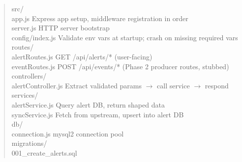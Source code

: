 \documentclass[11pt]{article}
\begin{document}
\begin{quote}
\small\ttfamily
src/ \\
\hspace*{1em}app.js\hspace{3.7cm} Express app setup, middleware registration in order \\
\hspace*{1em}server.js\hspace{3.3cm} HTTP server bootstrap \\
\hspace*{1em}config/index.js\hspace{2cm} Validate env vars at startup; crash on missing required vars \\
\hspace*{1em}routes/ \\
\hspace*{2em}alertRoutes.js\hspace{1.8cm} GET /api/alerts/* (user-facing) \\
\hspace*{2em}eventRoutes.js\hspace{1.8cm} POST /api/events/* (Phase 2 producer routes, stubbed) \\
\hspace*{1em}controllers/ \\
\hspace*{2em}alertController.js\hspace{1.1cm} Extract validated params $\rightarrow$ call service $\rightarrow$ respond \\
\hspace*{1em}services/ \\
\hspace*{2em}alertService.js\hspace{1.5cm} Query alert DB, return shaped data \\
\hspace*{2em}syncService.js\hspace{1.5cm} Fetch from upstream, upsert into alert DB \\
\hspace*{1em}db/ \\
\hspace*{2em}connection.js\hspace{1.9cm} mysql2 connection pool \\
\hspace*{2em}migrations/ \\
\hspace*{3em}001\_create\_alerts.sql \\

\end{quote}
\end{document}
